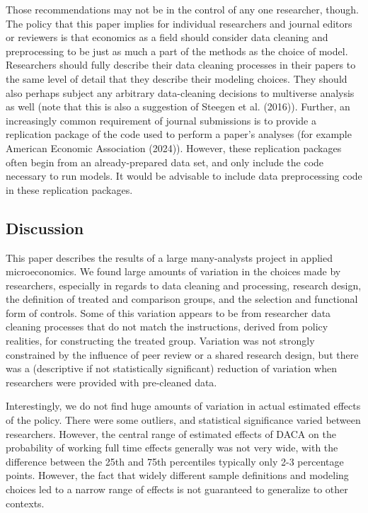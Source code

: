 \documentclass[
  letterpaper,
  DIV=11,
  numbers=noendperiod]{scrartcl}
\begin{document}
Those recommendations may not be in the control of any one researcher,
though. The policy that this paper implies for individual researchers
and journal editors or reviewers is that economics as a field should
consider data cleaning and preprocessing to be just as much a part of
the methods as the choice of model. Researchers should fully describe
their data cleaning processes in their papers to the same level of
detail that they describe their modeling choices. They should also
perhaps subject any arbitrary data-cleaning decisions to multiverse
analysis as well (note that this is also a suggestion of Steegen et al.
(2016)). Further, an increasingly common requirement of journal
submissions is to provide a replication package of the code used to
perform a paper's analyses (for example American Economic Association
(2024)). However, these replication packages often begin from an
already-prepared data set, and only include the code necessary to run
models. It would be advisable to include data preprocessing code in
these replication packages.

\hypertarget{discussion}{%
\subsection{Discussion}\label{discussion}}

This paper describes the results of a large many-analysts project in
applied microeconomics. We found large amounts of variation in the
choices made by researchers, especially in regards to data cleaning and
processing, research design, the definition of treated and comparison
groups, and the selection and functional form of controls. Some of this
variation appears to be from researcher data cleaning processes that do
not match the instructions, derived from policy realities, for
constructing the treated group. Variation was not strongly constrained
by the influence of peer review or a shared research design, but there
was a (descriptive if not statistically significant) reduction of
variation when researchers were provided with pre-cleaned data.

Interestingly, we do not find huge amounts of variation in actual
estimated effects of the policy. There were some outliers, and
statistical significance varied between researchers. However, the
central range of estimated effects of DACA on the probability of working
full time effects generally was not very wide, with the difference
between the 25th and 75th percentiles typically only 2-3 percentage
points. However, the fact that widely different sample definitions and
modeling choices led to a narrow range of effects is not guaranteed to
generalize to other contexts.
\end{document}
